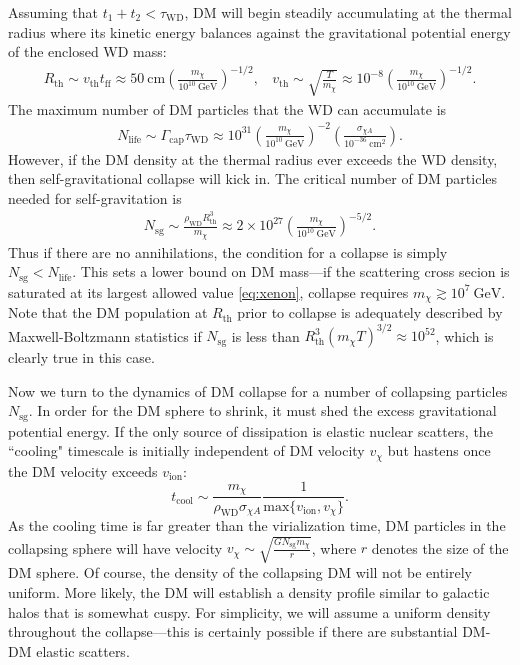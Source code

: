 \documentclass[preprintnumbers,amsmath,amssymb,prd,superscriptaddress]{revtex4}
\newcommand{\GeV}{\text{GeV}}
\newcommand{\cm}{\text{cm}}
\def\r{\right)}
\def\l{\left(}
\begin{document}
Assuming that $t_1 + t_2 < \tau_\text{WD}$, DM will begin steadily accumulating at the thermal radius where its kinetic energy balances against the gravitational potential energy of the enclosed WD mass:
\begin{align}
  R_\text{th} \sim v_\text{th} t_\text{ff} \approx 50 ~\cm \l \frac{m_\chi}{10^{10} ~\GeV}\r^{-1/2}, ~~~~   v_\text{th} \sim \sqrt{\frac{T}{m_\chi}} \approx 10^{-8} \l \frac{m_\chi}{10^{10} ~\GeV}\r^{-1/2}.
\end{align}
The maximum number of DM particles that the WD can accumulate is
\begin{align}
N_\text{life}  \sim \Gamma_\text{cap} \tau_\text{WD} \approx 10^{31}  \l \frac{m_\chi}{10^{10} ~\GeV} \r^{-2}  \l \frac{\sigma_{\chi A}}{10^{-36} ~\cm^2} \r.
\end{align}
However, if the DM density at the thermal radius ever exceeds the WD density, then self-gravitational collapse will kick in. 
The critical number of DM particles needed for self-gravitation is
\begin{align}
\label{eq:Nsg}
    N_\text{sg} \sim \frac{\rho_\text{WD} R^3_\text{th}}{m_\chi} \approx 2 \times 10^{27} \l \frac{m_\chi}{10^{10} ~\GeV} \r^{-5/2}.
\end{align}
Thus if there are no annihilations, the condition for a collapse is simply $N_\text{sg} < N_\text{life}$.
This sets a lower bound on DM mass---if the scattering cross secion is saturated at its largest allowed value \eqref{eq:xenon}, collapse requires $m_\chi \gtrsim 10^{7} ~\GeV$. 
Note that the DM population at $R_\text{th}$ prior to collapse is adequately described by Maxwell-Boltzmann statistics if $N_\text{sg}$ is less than $R_\text{th}^3 (m_\chi T)^{3/2} \approx 10^{52}$, which is clearly true in this case. 

Now we turn to the dynamics of DM collapse for a number of collapsing particles $N_\text{sg}$. 
In order for the DM sphere to shrink, it must shed the excess gravitational potential energy. 
If the only source of dissipation is elastic nuclear scatters, the ``cooling" timescale is initially independent of DM velocity $v_\chi$ but hastens once the DM velocity exceeds $v_\text{ion}$: 
\begin{equation}
\label{eq:tcool}
t_\text{cool} \sim \frac{m_\chi}{\rho_\text{WD} \sigma_{\chi A}} \frac{1}{\text{max}\{{v_\text{ion},v_\chi\}}}.
\end{equation}
As the cooling time is far greater than the virialization time, DM particles in the collapsing sphere will have velocity $v_\chi \sim \sqrt{\frac{G N_\text{sg} m_\chi}{r}}$, where $r$ denotes the size of the DM sphere. 
Of course, the density of the collapsing DM will not be entirely uniform.
More likely, the DM will establish a density profile similar to galactic halos that is somewhat cuspy. 
For simplicity, we will assume a uniform density throughout the collapse---this is certainly possible if there are substantial DM-DM elastic scatters. 
\end{document}
